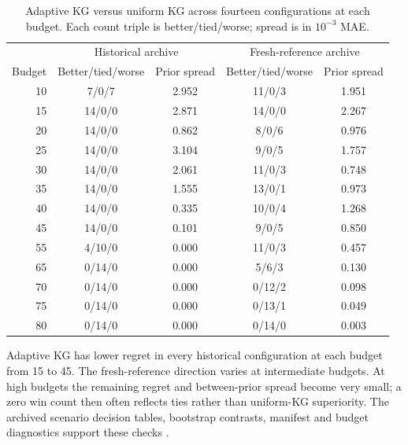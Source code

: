 \documentclass[10pt,a4paper]{article}
\begin{document}
\begin{table}[htbp]
\centering
\small
\caption{Adaptive KG versus uniform KG across fourteen configurations
at each budget. Each count triple is better/tied/worse; spread is in
$10^{-3}$ MAE.}
\label{tab:prior-budget-diagnostics}
\begin{tabular}{rcccc}
\toprule
& \multicolumn{2}{c}{Historical archive}
& \multicolumn{2}{c}{Fresh-reference archive}\\
Budget & Better/tied/worse & Prior spread
& Better/tied/worse & Prior spread\\
\midrule
10 & 7/0/7 & 2.952 & 11/0/3 & 1.951 \\
15 & 14/0/0 & 2.871 & 14/0/0 & 2.267 \\
20 & 14/0/0 & 0.862 & 8/0/6 & 0.976 \\
25 & 14/0/0 & 3.104 & 9/0/5 & 1.757 \\
30 & 14/0/0 & 2.061 & 11/0/3 & 0.748 \\
35 & 14/0/0 & 1.555 & 13/0/1 & 0.973 \\
40 & 14/0/0 & 0.335 & 10/0/4 & 1.268 \\
45 & 14/0/0 & 0.101 & 9/0/5 & 0.850 \\
55 & 4/10/0 & 0.000 & 11/0/3 & 0.457 \\
65 & 0/14/0 & 0.000 & 5/6/3 & 0.130 \\
70 & 0/14/0 & 0.000 & 0/12/2 & 0.098 \\
75 & 0/14/0 & 0.000 & 0/13/1 & 0.049 \\
80 & 0/14/0 & 0.000 & 0/14/0 & 0.003 \\
\bottomrule
\end{tabular}
\end{table}

Adaptive KG has lower regret in every historical configuration at each
budget from 15 to 45. The fresh-reference direction varies at intermediate
budgets. At high budgets the remaining regret and between-prior spread become
very small; a zero win count then often reflects ties rather than
uniform-KG superiority. The archived scenario decision tables, bootstrap
contrasts, manifest and budget diagnostics support these checks
\cite{praisePriorSensitivity}.

\clearpage


\clearpage

\end{document}
